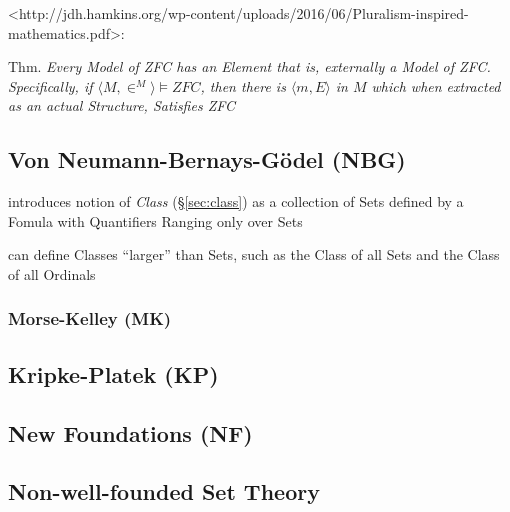 <http://jdh.hamkins.org/wp-content/uploads/2016/06/Pluralism-inspired-mathematics.pdf>:

Thm. \emph{Every Model of ZFC has an Element that is, externally a
  Model of ZFC. Specifically, if $\langle{M,\in^M}\rangle \vDash ZFC$,
then there is $\langle{m,E}\rangle$ in $M$ which when extracted as an
actual Structure, Satisfies ZFC}



\subsection{Von Neumann-Bernays-G\"odel (NBG)}\label{sec:nbg_set_theory}

introduces notion of \emph{Class} (\S\ref{sec:class}) as a collection of Sets
defined by a Fomula with Quantifiers Ranging only over Sets

can define Classes ``larger'' than Sets, such as the Class of all Sets and the
Class of all Ordinals



\subsubsection{Morse-Kelley (MK)}\label{sec:mk_set_theory}



\subsection{Kripke-Platek (KP)}\label{sec:kripke_platek}

\subsection{New Foundations (NF)}\label{sec:quine_foundations}

\subsection{Non-well-founded Set Theory}\label{sec:non_wellfounded}

